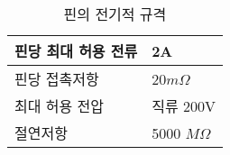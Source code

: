 %
%
\begin{table}[htbp]
\caption{핀의 전기적 규격}\label{table:pin-spec}
   \begin{center}
   \begin{tabular}{|l|l|} \hline
	핀당 최대 허용 전류 & 2A \\ \hline
	핀당 접촉저항 & 20$m\Omega$ \\ \hline
	최대 허용 전압 & 직류 200V \\ \hline
	절연저항 & 5000 $M\Omega$ \\ \hline
   \end{tabular}
   \end{center}
\end{table}
%
%
